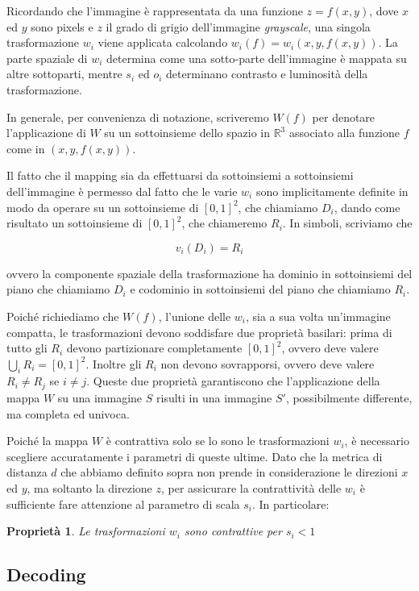 \documentclass[11pt,a4paper,appendixprefix=true,numbers=noenddot]{scrreprt}
\newtheorem{proprieta}[teorema]{Proprietà}
\begin{document}
Ricordando che l'immagine è rappresentata da una funzione $z = f(x,y)$, dove $x$ ed $y$ sono pixels e $z$ il grado di grigio dell'immagine \emph{grayscale}, una singola trasformazione $w_i$ viene applicata calcolando $w_i(f) = w_i(x, y, f(x,y))$. La parte spaziale di $w_i$ determina come una sotto-parte dell'immagine è mappata su altre sottoparti, mentre $s_i$ ed $o_i$ determinano contrasto e luminosità della trasformazione.

In generale, per convenienza di notazione, scriveremo $W(f)$ per denotare l'applicazione di $W$ su un sottoinsieme dello spazio in $\mathbb{R}^3$ associato alla funzione $f$ come in $(x, y, f(x,y))$.

Il fatto che il mapping sia da effettuarsi da sottoinsiemi a sottoinsiemi dell'immagine è permesso dal fatto che le varie $w_i$ sono implicitamente definite in modo da operare su un sottoinsieme di $[0,1]^2$, che chiamiamo $D_i$, dando come risultato un sottoinsieme di $[0,1]^2$, che chiameremo $R_i$. In simboli, scriviamo che

\[
v_i(D_i) = R_i
\]

ovvero la componente spaziale della trasformazione ha dominio in sottoinsiemi del piano che chiamiamo $D_i$ e codominio in sottoinsiemi del piano che chiamiamo $R_i$.

Poiché richiediamo che $W(f)$, l'unione delle $w_i$, sia a sua volta un'immagine compatta, le trasformazioni devono soddisfare due proprietà basilari: prima di tutto gli $R_i$ devono partizionare completamente $[0,1]^2$, ovvero deve valere $\bigcup_i R_i = [0,1]^2$. Inoltre gli $R_i$ non devono sovrapporsi, ovvero deve valere $R_i \not= R_j$ se $i \not= j$. Queste due proprietà garantiscono che l'applicazione della mappa $W$ su una immagine $S$ risulti in una immagine $S'$, possibilmente differente, ma completa ed univoca.

Poiché la mappa $W$ è contrattiva solo se lo sono le trasformazioni $w_i$, è necessario scegliere accuratamente i parametri di queste ultime. Dato che la metrica di distanza $d$ che abbiamo definito sopra non prende in considerazione le direzioni $x$ ed $y$, ma soltanto la direzione $z$, per assicurare la contrattività delle $w_i$ è sufficiente fare attenzione al parametro di scala $s_i$. In particolare:

\begin{proprieta}
Le trasformazioni $w_i$ sono contrattive per $s_i < 1$
\end{proprieta}

\subsection*{Decoding}
\end{document}
